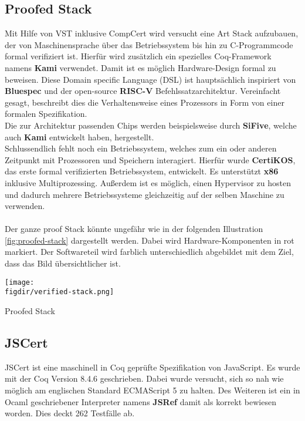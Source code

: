 \subsection{Proofed Stack}
Mit Hilfe von VST inklusive CompCert wird versucht eine Art Stack aufzubauen, der von Maschinensprache über das Betriebssystem bis hin zu C-Programmcode formal verifiziert ist. Hierfür wird zusätzlich ein spezielles Coq-Framework namens \textbf{Kami} verwendet. Damit ist es möglich Hardware-Design formal zu beweisen. Diese Domain specific Language (DSL) ist hauptsächlich inspiriert von \textbf{Bluespec} und der open-source \textbf{RISC-V} Befehlssatzarchitektur.\cite{KAMI01:ST} Vereinfacht gesagt, beschreibt dies die Verhaltensweise eines Prozessors in Form von einer formalen Spezifikation.\\
Die zur Architektur passenden Chips werden beispielsweise durch \textbf{SiFive}, welche auch \textbf{Kami} entwickelt haben, hergestellt.\\
Schlussendlich fehlt noch ein Betriebssystem, welches zum ein oder anderen Zeitpunkt mit Prozessoren und Speichern interagiert. Hierfür wurde \textbf{CertiKOS}, das erste formal verifizierten Betriebssystem, entwickelt. Es unterstützt \textbf{x86} inklusive Multiprozessing. Außerdem ist es möglich, einen Hypervisor zu hosten und dadurch mehrere Betriebssysteme gleichzeitig auf der selben Maschine zu verwenden.\cite{CERTIKOS01:FV}\cite{CERTIKOS02:FV}\\
\\
Der ganze proof Stack könnte ungefähr wie in der folgenden Illustration \ref{fig:proofed-stack} dargestellt werden. Dabei wird Hardware-Komponenten in rot markiert. Der Softwareteil wird farblich unterschiedlich abgebildet mit dem Ziel, dass das Bild übersichtlicher ist.\\


\begin{minipage}{\textwidth}
	\centering
	\captionsetup{type=figure}
	\texttt{[image: \\figdir/verified-stack.png]}
	\caption{Proofed Stack}
	\label{fig:proofed-stack}
\end{minipage}


\subsection{JSCert}
JSCert ist eine maschinell in Coq geprüfte Spezifikation von JavaScript. Es wurde mit der Coq Version 8.4.6 geschrieben. Dabei wurde versucht, sich so nah wie möglich am englischen Standard ECMAScript 5 zu halten. Des Weiteren ist ein in Ocaml geschriebener Interpreter namens \textbf{JSRef} damit als korrekt bewiesen worden. Dies deckt 262 Testfälle ab.\cite{JSCERT01:FV}\cite{JSCERT012:FV}

